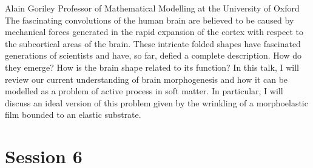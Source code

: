 \documentclass{article}
\begin{document}
{Alain Goriley}
{Professor of Mathematical Modelling at the University of Oxford}
{The fascinating convolutions of the human brain are believed to be caused by
mechanical forces generated in the rapid expansion of the cortex with respect to the
subcortical areas of the brain. These intricate folded shapes have fascinated generations
of scientists and have, so far, defied a complete description. How do they emerge? How is
the brain shape related to its function? In this talk, I will review our current
understanding of brain morphogenesis and how it can be modelled as a problem of active
process in soft matter. In particular, I will discuss an ideal version of this problem
given by the wrinkling of a morphoelastic film bounded to an elastic substrate.}

\newpage
\section*{Session 6}
\end{document}
